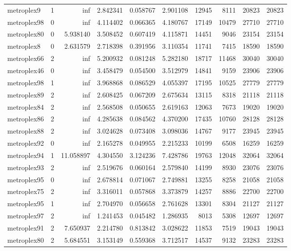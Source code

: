 \begin{longtable}{|l|r|r|r|r|r|r|r|r|r|}
metroplex9 & 1 & inf & 2.842341 & 0.058767 & 2.901108 & 12945 & 8111 & 20823 & 20823 \\
metroplex98 & 0 & inf & 4.114402 & 0.066365 & 4.180767 & 17149 & 10479 & 27710 & 27710 \\
metroplex80 & 0 & 5.938140 & 3.508452 & 0.607419 & 4.115871 & 14451 & 9046 & 23154 & 23154 \\
metroplex8 & 0 & 2.631579 & 2.718398 & 0.391956 & 3.110354 & 11741 & 7415 & 18590 & 18590 \\
metroplex66 & 2 & inf & 5.200932 & 0.081248 & 5.282180 & 18717 & 11468 & 30040 & 30040 \\
metroplex46 & 0 & inf & 3.458479 & 0.054500 & 3.512979 & 14841 & 9159 & 23906 & 23906 \\
metroplex98 & 1 & inf & 3.968868 & 0.086529 & 4.055397 & 17195 & 10525 & 27779 & 27779 \\
metroplex89 & 2 & inf & 2.608425 & 0.067209 & 2.675634 & 13115 & 8318 & 21118 & 21118 \\
metroplex84 & 2 & inf & 2.568508 & 0.050655 & 2.619163 & 12063 & 7673 & 19020 & 19020 \\
metroplex86 & 2 & inf & 4.285638 & 0.084562 & 4.370200 & 17435 & 10760 & 28128 & 28128 \\
metroplex88 & 2 & inf & 3.024628 & 0.073408 & 3.098036 & 14767 & 9177 & 23945 & 23945 \\
metroplex92 & 0 & inf & 2.165278 & 0.049955 & 2.215233 & 10199 & 6508 & 16259 & 16259 \\
metroplex94 & 1 & 11.058897 & 4.304550 & 3.124236 & 7.428786 & 19763 & 12048 & 32064 & 32064 \\
metroplex93 & 2 & inf & 2.519676 & 0.060164 & 2.579840 & 14199 & 8930 & 23076 & 23076 \\
metroplex95 & 0 & inf & 2.678814 & 0.071067 & 2.749881 & 13255 & 8258 & 21058 & 21058 \\
metroplex75 & 2 & inf & 3.316011 & 0.057868 & 3.373879 & 14257 & 8886 & 22700 & 22700 \\
metroplex95 & 1 & inf & 2.704970 & 0.056658 & 2.761628 & 13301 & 8304 & 21127 & 21127 \\
metroplex97 & 2 & inf & 1.241453 & 0.045482 & 1.286935 & 8013 & 5308 & 12697 & 12697 \\
metroplex91 & 2 & 7.650937 & 2.214780 & 0.813842 & 3.028622 & 11853 & 7519 & 19043 & 19043 \\
metroplex80 & 2 & 5.684551 & 3.153149 & 0.559368 & 3.712517 & 14537 & 9132 & 23283 & 23283 \\

\end{longtable}

